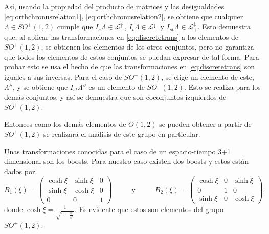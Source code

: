 Así, usando la propiedad del producto de matrices y las desigualdades \eqref{eq:orthchronusrelation1}, \eqref{eq:orthchronusrelation2}, se obtiene que cualquier $\Lambda \in SO^+(1,2)$ cumple que $I_s \Lambda \in \mathcal{L}_-^{\uparrow}$, $I_t \Lambda \in \mathcal{L}_-^{\downarrow}$ y $I_{st} \Lambda \in \mathcal{L}_+^{\downarrow}$. Esto demuestra que, al aplicar las transformaciones en \eqref{eq:discretetrans} a los elementos de $SO^+(1,2)$, se obtienen los elementos de los otros conjuntos, pero no garantiza que todos los elementos de estos conjuntos se puedan expresar de tal forma. Para probar esto se usa el hecho de que las transformaciones en \eqref{eq:discretetrans} son iguales a sus inversas. Para el caso de $SO^-(1,2)$, se elige un elemento de este, $\Lambda''$, y se obtiene que $I_{st} \Lambda''$ es un elemento de $SO^+(1,2)$. Esto se realiza para los demás conjuntos, y así se demuestra que son coconjuntos izquierdos de $SO^+(1,2)$.

Entonces como los demás elementos de $O(1,2)$ se pueden obtener a partir de $SO^+(1,2)$ se realizará el análisis de este grupo en particular.

Unas transformaciones conocidas para el caso de un espacio-tiempo 3+1 dimensional son los boosts. Para nuestro caso existen dos boosts y estos están dados por
\begin{equation}
	B_1(\xi) = \begin{pmatrix}
		\cosh\xi & \sinh\xi & 0 \\
		\sinh\xi & \cosh\xi & 0 \\
		0        & 0        & 1
	\end{pmatrix} \hspace{1cm}\text{ y }\hspace{1cm}B_2(\xi) = \begin{pmatrix}
		\cosh\xi & 0 & \sinh\xi \\
		0        & 1 & 0        \\
		\sinh\xi & 0 & \cosh\xi
	\end{pmatrix},
\end{equation}
donde $\cosh\xi= \frac{1}{\sqrt{1-\frac{v^2}{c^2}}}$. Es evidente que estos son elementos del grupo $SO^+(1,2)$.

